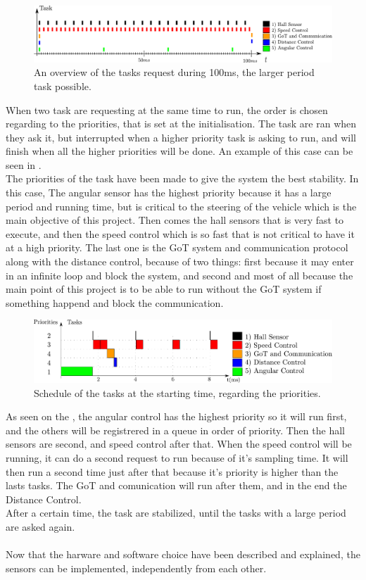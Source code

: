  \begin{figure}[H]
	\centering
	\includegraphics[scale=0.6]{figures/scheduleRequest.pdf}
	\caption{An overview of the tasks request during 100ms, the larger period task possible.}
	\label{scheduleRequestd}
\end{figure}


When two task are requesting at the same time to run, the order is chosen regarding to the priorities, that is set at the initialisation. The task are ran when they ask it, but interrupted when a higher priority task is asking to run, and will finish when all the higher priorities will be done. An example of this case can be seen in .\\
The priorities of the task have been made to give the system the best stability. In this case, The angular sensor has the highest priority because it has a large period and running time, but is critical to the steering of the vehicle which is the main objective of this project. Then comes the hall sensors that is very fast to execute, and then the speed control which is so fast that is not critical to have it at a high priority. The last one is the GoT system and communication protocol along with the distance control, because of two things: first because it may enter in an infinite loop and block the system, and second and most of all because the main point of this project is to be able to run without the GoT system if something happend and block the communication.

 \begin{figure}[H]
	\centering
	\includegraphics[scale=0.5]{figures/schedulePriorities.pdf}
	\caption{Schedule of the tasks at the starting time, regarding the priorities.}
	\label{schedulePriorities}
\end{figure}

As seen on the  , the angular control has the highest priority so it will run first, and the others will be registrered in a queue in order of priority. Then the hall sensors are second, and speed control after that. When the speed control will be running, it can do a second request to run because of it's sampling time. It will then run a second time just after that because it's priority is higher than the lasts tasks. The GoT and comunication will run after them, and in the end the Distance Control.\\
After a certain time, the task are stabilized, until the tasks with a large period are asked again.\\\\



Now that the harware and software choice have been described and explained, the sensors can be implemented, independently from each other.